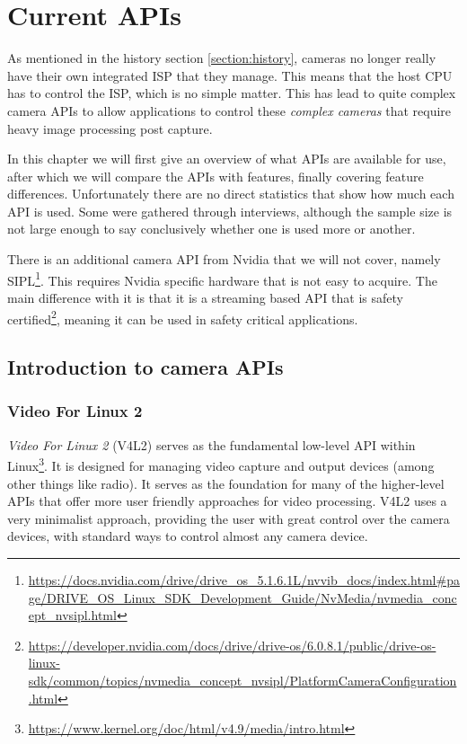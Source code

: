 \chapter{Current APIs\label{section:currentAPIs}}
As mentioned in the history section \cref{section:history}, cameras no longer
really have their own integrated ISP that they manage. This means that the
host CPU has to control the ISP, which is no simple matter. This has lead to
quite complex camera APIs to allow applications to control these
\textit{complex cameras} that require heavy image processing post capture.

In this chapter we will first give an overview of what APIs are available for
use, after which we will compare the APIs with features, finally covering
feature differences. Unfortunately there are no direct statistics that show how
much each API is used. Some were gathered through interviews, although the
sample size is not large enough to say conclusively whether one is used more or
another.

There is an additional camera API from Nvidia that we will not cover, namely
SIPL\footnote{\url{https://docs.nvidia.com/drive/drive_os_5.1.6.1L/nvvib_docs/index.html\#page/DRIVE_OS_Linux_SDK_Development_Guide/NvMedia/nvmedia_concept_nvsipl.html}}. This requires Nvidia specific hardware that is not easy to acquire. The
main difference with it is that it is a streaming based API that is safety
certified\footnote{\url{https://developer.nvidia.com/docs/drive/drive-os/6.0.8.1/public/drive-os-linux-sdk/common/topics/nvmedia\_concept\_nvsipl/PlatformCameraConfiguration.html}},
meaning it can be used in safety critical applications.

\section{Introduction to camera APIs}
\subsection{Video For Linux 2}\label{section:v4l2}
\textit{Video For Linux 2} (V4L2) serves as the fundamental low-level API
within Linux\footnote{\url{https://www.kernel.org/doc/html/v4.9/media/intro.html}}.
It is designed for managing video capture and output devices (among other things
like radio). It serves as the foundation for many of the higher-level APIs that
offer more user friendly approaches for video processing. V4L2 uses a very
minimalist approach, providing the user with great control over the camera
devices, with standard ways to control almost any camera device.

